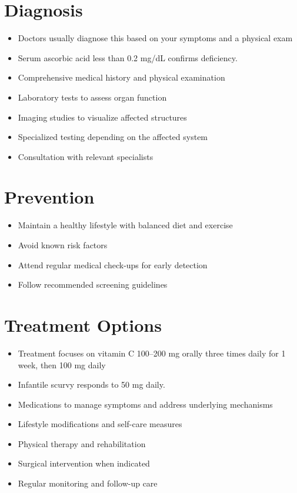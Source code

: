 \section{Diagnosis}
\begin{itemize}[noitemsep]
  \item Doctors usually diagnose this based on your symptoms and a physical exam
  \item Serum ascorbic acid less than 0.2 mg/dL confirms deficiency.
  \item Comprehensive medical history and physical examination
  \item Laboratory tests to assess organ function
  \item Imaging studies to visualize affected structures
  \item Specialized testing depending on the affected system
  \item Consultation with relevant specialists
\end{itemize}
\section{Prevention}
\begin{itemize}[noitemsep]
  \item Maintain a healthy lifestyle with balanced diet and exercise
  \item Avoid known risk factors
  \item Attend regular medical check-ups for early detection
  \item Follow recommended screening guidelines
\end{itemize}
\section{Treatment Options}
\begin{itemize}[noitemsep]
  \item Treatment focuses on vitamin C 100--200 mg orally three times daily for 1 week, then 100 mg daily
  \item Infantile scurvy responds to 50 mg daily.
  \item Medications to manage symptoms and address underlying mechanisms
  \item Lifestyle modifications and self-care measures
  \item Physical therapy and rehabilitation
  \item Surgical intervention when indicated
  \item Regular monitoring and follow-up care
\end{itemize}
